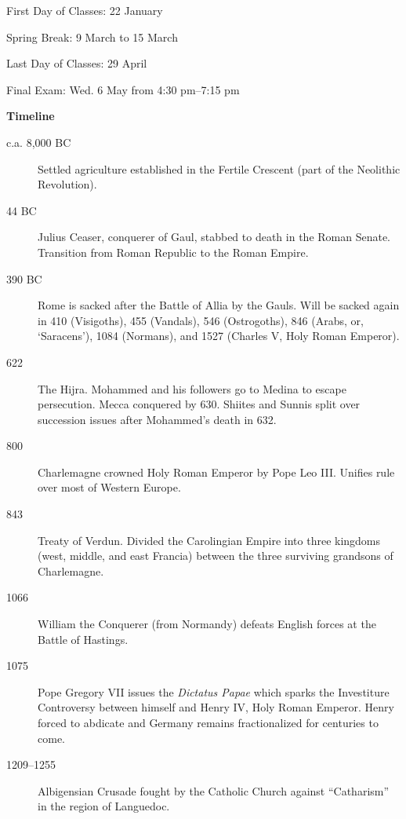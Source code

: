 \documentclass[11pt]{article}
\begin{document}
First Day of Classes:  22 January

Spring Break: 9 March to 15 March

Last Day of Classes:  29 April

Final Exam: Wed. 6 May from 4:30 pm--7:15 pm

\newpage
\noindent\textbf{Timeline}
\vspace{.25in}

\begin{description}

\item[c.a. 8,000 BC] Settled agriculture established in the Fertile Crescent (part of the Neolithic Revolution).

\item[44 BC]  Julius Ceaser, conquerer of Gaul, stabbed to death in the Roman Senate.  Transition from Roman Republic to the Roman Empire.

\item[390 BC]  Rome is sacked after the Battle of Allia by the Gauls.  Will be sacked again in 410 (Visigoths), 455 (Vandals), 546 (Ostrogoths), 846 (Arabs, or, `Saracens'), 1084 (Normans), and 1527 (Charles V, Holy Roman Emperor).

\item[622]  The Hijra.  Mohammed and his followers go to Medina to escape persecution.  Mecca conquered by 630.  Shiites and Sunnis split over succession issues after Mohammed's death in 632.

\item[800]  Charlemagne crowned Holy Roman Emperor by Pope Leo III.  Unifies rule over most of Western Europe.

\item[843]  Treaty of Verdun.  Divided the Carolingian Empire into three kingdoms (west, middle, and east Francia) between the three surviving grandsons of Charlemagne.  

\item[1066] William the Conquerer (from Normandy) defeats English forces at the Battle of Hastings.

\item[1075] Pope Gregory VII issues the \textit{Dictatus Papae} which sparks the Investiture Controversy between himself and Henry IV, Holy Roman Emperor.  Henry forced to abdicate and Germany remains fractionalized for centuries to come.

\item[1209--1255]  Albigensian Crusade fought by the Catholic Church against ``Catharism'' in the region of Languedoc.


\end{description}
\end{document}
